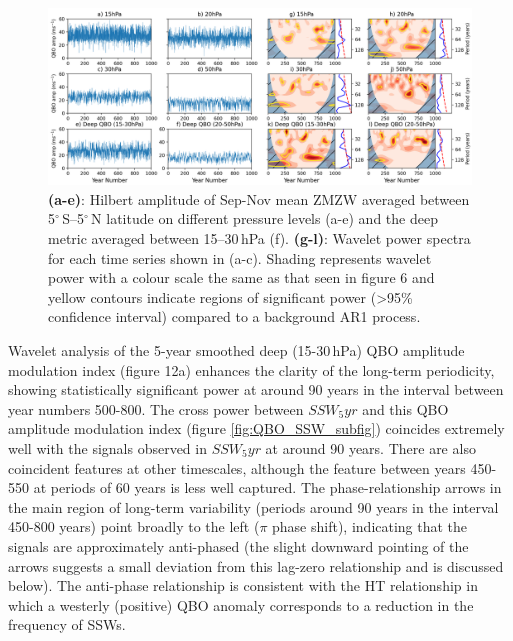
\begin{center}
\begin{figure}[h!]
\includegraphics[width = \linewidth]{Figures/Figures-origins/QBO_levels_amp.png}
\caption[QBO amplitude timeseries and associated wavelet power spectra at different levels in UKESM]{\textbf{(a-e)}: Hilbert amplitude of Sep-Nov mean ZMZW averaged between 5$^\circ$\,S--5$^\circ$\,N latitude on different pressure levels (a-e) and the deep metric averaged between 15--30\,hPa (f). \textbf{(g-l)}: Wavelet power spectra for each time series shown in (a-c). Shading represents wavelet power with a colour scale the same as that seen in figure 6 and yellow contours indicate regions of significant power (>95\% confidence interval) compared to a background AR1 process.}
\label{QBO_levs_amp}
\end{figure}
\end{center}


Wavelet analysis of the 5-year smoothed deep (15-30\,hPa) QBO amplitude modulation index (figure 12a) enhances the clarity of the long-term periodicity, showing statistically significant power at around 90 years in the interval between year numbers 500-800. The cross power between $SSW_5yr$ and this QBO amplitude modulation index (figure \ref{fig:QBO_SSW_subfig}) coincides extremely well with the signals observed in $SSW_5yr$ at around 90 years. There are also coincident features at other timescales, although the feature between years 450-550 at periods of 60 years is less well captured. The phase-relationship arrows in the main region of long-term variability (periods around 90 years in the interval 450-800 years) point broadly to the left ($\pi$ phase shift), indicating that the signals are approximately anti-phased (the slight downward pointing of the arrows suggests a small deviation from this lag-zero relationship and is discussed below). The anti-phase relationship is consistent with the HT relationship in which a westerly (positive) QBO anomaly corresponds to a reduction in the frequency of SSWs.

